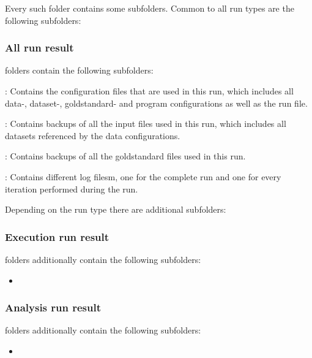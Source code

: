 	
	Every such folder contains some subfolders. Common to all run types are the following subfolders:
	
	\subsubsection{All run result} folders contain the following subfolders:
	
	\begin{description}
		\item \highlight{\reporesultconfigs}: Contains the configuration files that are used in this run, which includes all data-, dataset-, goldstandard- and program configurations as well as the run file.
		\item \highlight{\reporesultinputs}: Contains backups of all the input files used in this run, which includes all datasets referenced by the data configurations.
		\item \highlight{\reporesultgs}: Contains backups of all the goldstandard files used in this run.
		\item \highlight{\reporesultlogs}: Contains different log filesm, one for the complete run and one for every iteration performed during the run.
	\end{description}
	
	Depending on the run type there are additional subfolders:
	
	\subsubsection{Execution run result} folders additionally contain the following subfolders:
	
	\begin{itemize}
		\item \highlight{\reporesultcluster}
	\end{itemize}
	
	\subsubsection{Analysis run result} folders additionally contain the following subfolders:
	
	\begin{itemize}
		\item \highlight{\reporesultanalyses}
	\end{itemize}
	